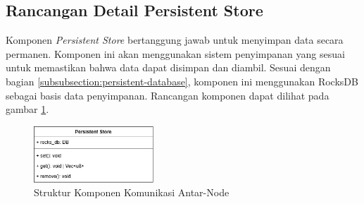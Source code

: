 \subsection{Rancangan Detail Persistent Store}
\label{subsection:detail-persistent-store}

Komponen \textit{Persistent Store} bertanggung jawab untuk menyimpan data secara permanen. Komponen ini akan menggunakan sistem penyimpanan yang sesuai untuk memastikan bahwa data dapat disimpan dan diambil. Sesuai dengan bagian \ref{subsubsection:persistent-database}, komponen ini menggunakan RocksDB sebagai basis data penyimpanan. Rancangan komponen dapat dilihat pada gambar \ref{fig:persistent-store-component}.

\begin{figure}[ht]
    \centering
    \includegraphics[width=0.4\textwidth]{resources/chapter-3/persistent-store-component.png}
    \caption{Struktur Komponen Komunikasi Antar-Node}
    \label{fig:persistent-store-component}
\end{figure}